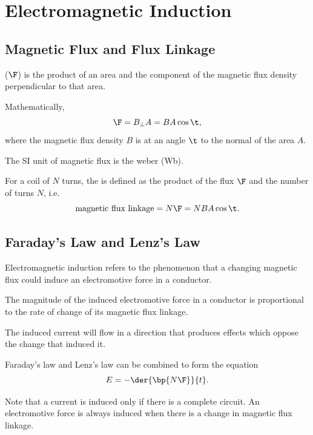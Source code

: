 \chapter{Electromagnetic Induction}

\section{Magnetic Flux and Flux Linkage}

\begin{definition}
     ($\F$) is the product of an area and the component of the magnetic flux density perpendicular to that area.
\end{definition}

Mathematically, \[\F = B_{\perp} A = BA\cos\t,\] where the magnetic flux density $B$ is at an angle $\t$ to the normal of the area $A$.

The SI unit of magnetic flux is the weber (Wb).

\begin{definition}
    For a coil of $N$ turns, the  is defined as the product of the flux $\F$ and the number of turns $N$, i.e. \[\text{magnetic flux linkage} = N\F = NBA\cos\t.\]
\end{definition}

\section{Faraday's Law and Lenz's Law}

Electromagnetic induction refers to the phenomenon that a changing magnetic flux could induce an electromotive force in a conductor.

\begin{law}
    The magnitude of the induced electromotive force in a conductor is proportional to the rate of change of its magnetic flux linkage.
\end{law}

\begin{law}
    The induced current will flow in a direction that produces effects which oppose the change that induced it.
\end{law}

Faraday's law and Lenz's law can be combined to form the equation \[E = -\der{\bp{N\F}}{t}.\]

Note that a current is induced only if there is a complete circuit. An electromotive force is always induced when there is a change in magnetic flux linkage.

